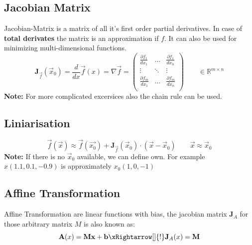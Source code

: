 \subsection{Jacobian Matrix}
Jacobian-Matrix is a matrix of all it's first order partial derivatives. In case of \textbf{total derivates} the matrix is an approximation if $f$. It can also be used for minimizing multi-dimensional functions.
\[
\mathbf{J}_{\vec{f}}(\vec{x}_0) = \frac{d}{dx}\vec{f}(x) = \nabla\vec{f} = \begin{pmatrix}
	\frac{\partial f_1}{dx_1} & \dots & \frac{\partial f_1}{dx_n} \\
	\vdots & \ddots & \vdots \\
	\frac{\partial f_m}{dx_1} & \dots & \frac{\partial f_m}{dx_n} \\
\end{pmatrix} \qquad \in \mathbb{R}^{m \times n}
\]
\noindent\textbf{Note:} For more complicated excersices also the chain rule can be used.

\subsection{Liniarisation}
\[
\vec{f}(\vec{x}) \approx \vec{f}(\vec{x_0}) + \mathbf{J}_{\vec{f}}(\vec{x}_0) \cdot (\vec{x} - \vec{x}_0)  \qquad \vec{x} \approx \vec{x}_0
\]
\textbf{Note:} If there is no $\vec{x}_0$ available, we can define own. For example $x(1.1, 0.1, -0.9)$ is approximately $x_0(1, 0, -1)$

\subsection{Affine Transformation}
Affine Transformation are linear functions with bias, the jacobian matrix $\mathbf{J}_A$ for those arbitrary matrix $M$ is also known as:
\[
\mathbf{A}(x) = \mathbf{M}\mathbf{x} + \mathbf{b} \xRightarrow[]{!} \mathbf{J}_A(x) = \mathbf{M}
\]
